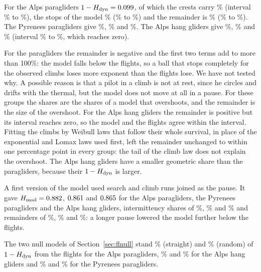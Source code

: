 \documentclass[11pt,a4paper]{article}
\begin{document}
For the Alps paragliders $1 - H_{\mathrm{dyn}} = 0.099$, of which the crests carry \flPctGeometryAlpsPara\%
(interval \flPctGeometryAlpsParaLo\% to \flPctGeometryAlpsParaHi\%), the stops of the model
\flPctInterAlpsPara\% (\flPctInterAlpsParaLo\% to \flPctInterAlpsParaHi\%) and the remainder is
\flPctOtherAlpsPara\% (\flPctOtherAlpsParaLo\% to \flPctOtherAlpsParaHi\%). The Pyrenees paragliders give
\flPctGeometryPyrPara\%, \flPctInterPyrPara\% and \flPctOtherPyrPara\%. The Alps hang gliders give
\flPctGeometryAlpsHang\%, \flPctInterAlpsHang\% and \flPctOtherAlpsHang\% (interval \flPctOtherAlpsHangLo\% to
\flPctOtherAlpsHangHi\%, which reaches zero).

For the paragliders the remainder is negative and the first two terms add to more than 100\%: the model falls
below the flights, so a ball that stops completely for the observed climbs loses more exponent than the flights
lose. We have not tested why. A possible reason is that a pilot in a climb is not at rest, since he circles and
drifts with the thermal, but the model does not move at all in a pause. For these groups the shares are the
shares of a model that overshoots, and the remainder is the size of the overshoot. For the Alps hang gliders the
remainder is positive but its interval reaches zero, so the model and the flights agree within the interval. Fitting the climbs
by Weibull laws that follow their whole survival, in place of the exponential and Lomax laws used first, left the remainder
unchanged to within one percentage point in every group: the tail of the climb law does not explain the overshoot.
The Alps hang gliders have a smaller geometric share than the paragliders, because their $1 - H_{\mathrm{dyn}}$ is larger.

A first version of the model used search and climb runs joined as the pause. It gave $H_{\mathrm{mod}} = 0.882$,
$0.861$ and $0.865$ for the Alps paragliders, the Pyrenees paragliders and the Alps hang
gliders, intermittency shares of \flPctInterOldAlpsPara\%, \flPctInterOldPyrPara\% and \flPctInterOldAlpsHang\%
and remainders of \flPctOtherOldAlpsPara\%, \flPctOtherOldPyrPara\% and \flPctOtherOldAlpsHang\%: a longer
pause lowered the model further below the flights.

The two null models of Section~\ref{sec:flnull} stand \flNullGapStraightAlpsPara\% (straight) and
\flNullGapRandomAlpsPara\% (random) of $1-H_{\mathrm{dyn}}$ from the flights for the Alps paragliders, \flNullGapStraightAlpsHang\% and
\flNullGapRandomAlpsHang\% for the Alps hang gliders and \flNullGapStraightPyrPara\% and \flNullGapRandomPyrPara\% for the
Pyrenees paragliders.
\end{document}
